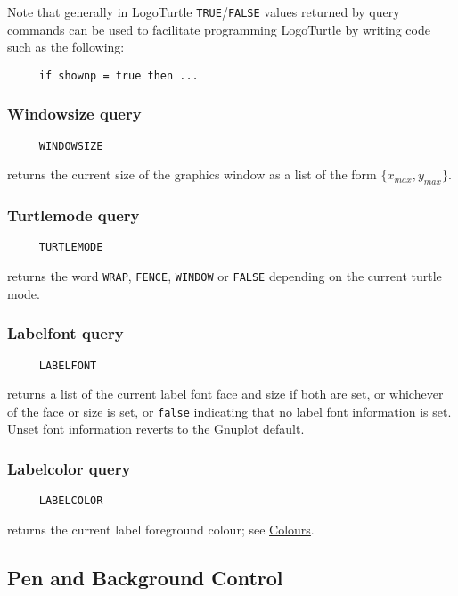 Note that generally in LogoTurtle \texttt{TRUE}/\texttt{FALSE} values
returned by query commands can be used to facilitate programming
LogoTurtle by writing code such as the following:
\begin{verbatim}
     if shownp = true then ...
\end{verbatim}

\subsubsection*{Windowsize query}
\begin{verbatim}
     WINDOWSIZE
\end{verbatim}
returns the current size of the graphics window as a list of the form
$\{x_{max},y_{max}\}$.

\subsubsection*{Turtlemode query}
\begin{verbatim}
     TURTLEMODE
\end{verbatim}
returns the word \texttt{WRAP}, \texttt{FENCE}, \texttt{WINDOW} or
\texttt{FALSE} depending on the current turtle mode.

\hypertarget{logoturtle:labelfont}{\subsubsection*{Labelfont query}}
\begin{verbatim}
     LABELFONT
\end{verbatim}
returns a list of the current label font face and size if both are
set, or whichever of the face or size is set, or \texttt{false}
indicating that no label font information is set.  Unset font
information reverts to the Gnuplot default.

\subsubsection*{Labelcolor query}
\begin{verbatim}
     LABELCOLOR
\end{verbatim}
returns the current label foreground colour; see
\hyperref[logoturtle:Colours]{Colours}.


\subsection{Pen and Background Control}
\label{logoturtle:PBC}

